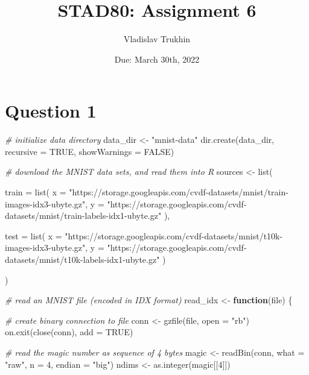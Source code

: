 \documentclass[
]{article}
\title{STAD80: Assignment 6}
\author{Vladislav Trukhin}
\date{Due: March 30th, 2022}
\newenvironment{Shaded}{\begin{snugshade}}{\end{snugshade}}
\newcommand{\AttributeTok}[1]{\textcolor[rgb]{0.77,0.63,0.00}{#1}}
\newcommand{\CommentTok}[1]{\textcolor[rgb]{0.56,0.35,0.01}{\textit{#1}}}
\newcommand{\ConstantTok}[1]{\textcolor[rgb]{0.00,0.00,0.00}{#1}}
\newcommand{\ControlFlowTok}[1]{\textcolor[rgb]{0.13,0.29,0.53}{\textbf{#1}}}
\newcommand{\DecValTok}[1]{\textcolor[rgb]{0.00,0.00,0.81}{#1}}
\newcommand{\FunctionTok}[1]{\textcolor[rgb]{0.00,0.00,0.00}{#1}}
\newcommand{\NormalTok}[1]{#1}
\newcommand{\OtherTok}[1]{\textcolor[rgb]{0.56,0.35,0.01}{#1}}
\newcommand{\StringTok}[1]{\textcolor[rgb]{0.31,0.60,0.02}{#1}}
\begin{document}
\maketitle

{
\setcounter{tocdepth}{2}
\tableofcontents
}
\hypertarget{question-1}{%
\section{Question 1}\label{question-1}}

\begin{Shaded}
\begin{Highlighting}[]
\CommentTok{\# initialize data directory}
\NormalTok{data\_dir }\OtherTok{\textless{}{-}} \StringTok{"mnist{-}data"}
\FunctionTok{dir.create}\NormalTok{(data\_dir, }\AttributeTok{recursive =} \ConstantTok{TRUE}\NormalTok{, }\AttributeTok{showWarnings =} \ConstantTok{FALSE}\NormalTok{)}

\CommentTok{\# download the MNIST data sets, and read them into R}
\NormalTok{sources }\OtherTok{\textless{}{-}} \FunctionTok{list}\NormalTok{(}
  
  \AttributeTok{train =} \FunctionTok{list}\NormalTok{(}
    \AttributeTok{x =} \StringTok{"https://storage.googleapis.com/cvdf{-}datasets/mnist/train{-}images{-}idx3{-}ubyte.gz"}\NormalTok{,}
    \AttributeTok{y =} \StringTok{"https://storage.googleapis.com/cvdf{-}datasets/mnist/train{-}labels{-}idx1{-}ubyte.gz"}
\NormalTok{  ),}
  
  \AttributeTok{test =} \FunctionTok{list}\NormalTok{(}
    \AttributeTok{x =} \StringTok{"https://storage.googleapis.com/cvdf{-}datasets/mnist/t10k{-}images{-}idx3{-}ubyte.gz"}\NormalTok{,}
    \AttributeTok{y =} \StringTok{"https://storage.googleapis.com/cvdf{-}datasets/mnist/t10k{-}labels{-}idx1{-}ubyte.gz"}
\NormalTok{  )}
  
\NormalTok{)}

\CommentTok{\# read an MNIST file (encoded in IDX format)}
\NormalTok{read\_idx }\OtherTok{\textless{}{-}} \ControlFlowTok{function}\NormalTok{(file) \{}
  
  \CommentTok{\# create binary connection to file}
\NormalTok{  conn }\OtherTok{\textless{}{-}} \FunctionTok{gzfile}\NormalTok{(file, }\AttributeTok{open =} \StringTok{"rb"}\NormalTok{)}
  \FunctionTok{on.exit}\NormalTok{(}\FunctionTok{close}\NormalTok{(conn), }\AttributeTok{add =} \ConstantTok{TRUE}\NormalTok{)}
  
  \CommentTok{\# read the magic number as sequence of 4 bytes}
\NormalTok{  magic }\OtherTok{\textless{}{-}} \FunctionTok{readBin}\NormalTok{(conn, }\AttributeTok{what =} \StringTok{"raw"}\NormalTok{, }\AttributeTok{n =} \DecValTok{4}\NormalTok{, }\AttributeTok{endian =} \StringTok{"big"}\NormalTok{)}
\NormalTok{  ndims }\OtherTok{\textless{}{-}} \FunctionTok{as.integer}\NormalTok{(magic[[}\DecValTok{4}\NormalTok{]])}
  

\end{Highlighting}
\end{Shaded}
\end{document}
